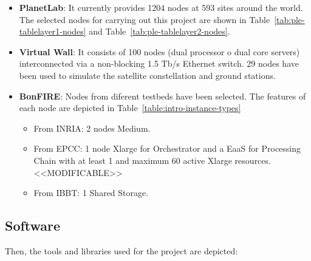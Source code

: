 \begin{itemize}
\item \textbf{PlanetLab}: It currently provides 1204 nodes at 593 sites around
  the world. The selected nodes for carrying out this project are shown in
  Table~\ref{tab:ple-tablelayer1-nodes} and Table~\ref{tab:ple-tablelayer2-nodes}.

\item \textbf{Virtual Wall}: It consists of 100 nodes (dual processor o dual
  core servers) interconnected via a non-blocking 1.5 Tb/s Ethernet switch. 29
  nodes have been used to simulate the satellite constellation and ground
  stations. 

\item \textbf{BonFIRE}: Nodes from diferent testbeds have been selected. The
  features of each node are depicted in Table~\ref{table:intro-instance-types} 
  \begin{itemize}
    \item From INRIA: 2 nodes Medium.
    \item From EPCC: 1 node Xlarge for Orchestrator and a \ac{EaaS} for
      Processing Chain with at least 1  and maximum 60 active Xlarge resources. <<MODIFICABLE>>
    \item From IBBT: 1 Shared Storage.

    \end{itemize}
\end{itemize}


\subsection{Software}

Then, the tools and libraries used for the project are depicted:

